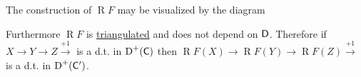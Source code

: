\documentclass[../../main]{subfiles}
\begin{document}
\begin{remark}\label{rem:right-derived-functor-construction}
  The construction of \(\operatorname{R}F\) may be visualized by the diagram
  \begin{center}
  \end{center}
  Furthermore \(\operatorname{R}F\) is \hyperref[def:triangulated-functor]{triangulated} and does not depend on \(\mathsf{D}\).
  Therefore if \(X \to Y \to Z \xrightarrow{+1}\) is a d.t. in \(\operatorname{D}^{+}(\mathsf{C})\) then \(\operatorname{R}F(X) \to \operatorname{R}F(Y) \to \operatorname{R}F(Z) \xrightarrow{+1}\) is a d.t. in \(\operatorname{D}^{+}(\mathsf{C'})\).
\end{remark}
\end{document}
